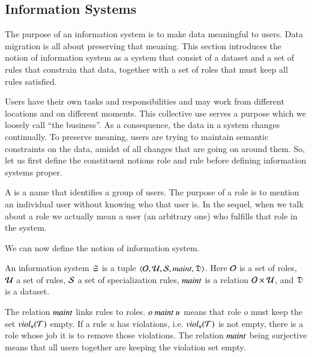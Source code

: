 \documentclass{elsarticle}
\begin{document}
\subsection{Information Systems}
\label{sct:Information Systems}
   The purpose of an information system is to make data meaningful to users.
   Data migration is all about preserving that meaning.
   This section introduces the notion of information system
   as a system that consist of a dataset and a set of rules that constrain that data,
   together with a set of roles that must keep all rules satisfied.

   Users have their own tasks and responsibilities
   and may work from different locations and on different moments.
   This collective use serves a purpose which we loosely call ``the business''.
   As a consequence, the data in a system changes continually.
   To preserve meaning, users are trying to maintain semantic constraints on the data,
   amidst of all changes that are going on around them.
   So, let us first define the constituent notions role and rule before defining information systems proper.

   A  is a name that identifies a group of users.
   The purpose of a role is to mention an individual user without knowing who that user is.
   In the sequel, when we talk about a role we actually mean a user (an arbitrary one) who fulfills that role in the system.
   

   We can now define the notion of information system.
\begin{definition}
\label{def:information system}
\item An information system $\mathfrak{S}$ is a tuple $\langle\mathcal{O},\mathcal{U},\mathcal{S},\text{\it maint\/},\mathfrak{D}\rangle$.
   Here $\mathcal{O}$ is a set of roles,
   $\mathcal{U}$ a set of rules,
   $\mathcal{S}$ a set of specialization rules,
   $\text{\it maint\/}$ is a relation $\mathcal{O}\times\mathcal{U}$,
   and $\mathfrak{D}$ is a dataset.
\end{definition}
   The relation $\text{\it maint\/}$ links rules to roles.
   $o\ \text{\it maint\/}\ u$ means that role $o$ must keep the set $\text{\it viol\/}_{u}(\mathcal{T})$ empty.
   If a rule $u$ has violations, i.e. $\text{\it viol\/}_{u}(\mathcal{T})$ is not empty, there is a role whose job it is to remove those violations.
   The relation $\text{\it maint\/}$ being surjective means that all users together are keeping the violation set empty.
\end{document}
